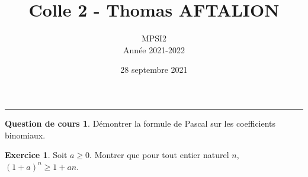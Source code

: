 \documentclass[a4paper, 11pt,openany]{article}%
\title{Colle 2 - Thomas AFTALION}
\author{MPSI2\\
Année 2021-2022}
\date{28 septembre 2021}
\theoremstyle{plain}
\theoremstyle{definition}
\newtheorem{cours}{Question de cours}
\newtheorem{exo}{Exercice}
\newtheorem{sol}{Solution de l'exercice}
\theoremstyle{remark}
\newcommand{\N}{\mathbb{N}}
\begin{document}
   \maketitle
      \rule{\linewidth}{0.5mm}

\begin{cours}
Démontrer la formule de Pascal sur les coefficients binomiaux.
\end{cours}

\begin{exo}
Soit $a\geqslant 0$. Montrer que pour tout entier naturel $n$, $(1+a)^n\geqslant 1+an$.
\end{exo}


\end{document}
